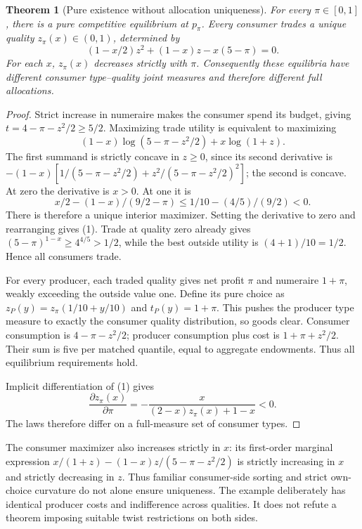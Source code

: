 \documentclass[11pt,a4paper]{article}
\newtheorem{theorem}{Theorem}[section]
\theoremstyle{remark}
\begin{document}
\begin{theorem}[Pure existence without allocation uniqueness]
For every $\pi\in[0,1]$, there is a pure competitive equilibrium at $p_\pi$. Every consumer trades a unique quality $z_\pi(x)\in(0,1)$, determined by
\[
 (1-x/2)z^2+(1-x)z-x(5-\pi)=0. \tag{1}
\]
For each $x$, $z_\pi(x)$ decreases strictly with $\pi$. Consequently these equilibria have different consumer type--quality joint measures and therefore different full allocations.
\end{theorem}
\begin{proof}
Strict increase in numeraire makes the consumer spend its budget, giving $t=4-\pi-z^2/2\ge5/2$. Maximizing trade utility is equivalent to maximizing
\[
 (1-x)\log(5-\pi-z^2/2)+x\log(1+z).
\]
The first summand is strictly concave in $z\ge0$, since its second derivative is $-(1-x)[1/(5-\pi-z^2/2)+z^2/(5-\pi-z^2/2)^2]$; the second is concave. At zero the derivative is $x>0$. At one it is
\[
 x/2-(1-x)/(9/2-\pi)\le1/10-(4/5)/(9/2)<0.
\]
There is therefore a unique interior maximizer. Setting the derivative to zero and rearranging gives (1). Trade at quality zero already gives $(5-\pi)^{1-x}\ge4^{4/5}>1/2$, while the best outside utility is $(4+1)/10=1/2$. Hence all consumers trade.

For every producer, each traded quality gives net profit $\pi$ and numeraire $1+\pi$, weakly exceeding the outside value one. Define its pure choice as $z_P(y)=z_\pi(1/10+y/10)$ and $t_P(y)=1+\pi$. This pushes the producer type measure to exactly the consumer quality distribution, so goods clear. Consumer consumption is $4-\pi-z^2/2$; producer consumption plus cost is $1+\pi+z^2/2$. Their sum is five per matched quantile, equal to aggregate endowments. Thus all equilibrium requirements hold.

Implicit differentiation of (1) gives
\[
 \frac{\partial z_\pi(x)}{\partial\pi}
 =-\frac{x}{(2-x)z_\pi(x)+1-x}<0.
\]
The laws therefore differ on a full-measure set of consumer types.
\end{proof}

The consumer maximizer also increases strictly in $x$: its first-order marginal expression $x/(1+z)-(1-x)z/(5-\pi-z^2/2)$ is strictly increasing in $x$ and strictly decreasing in $z$. Thus familiar consumer-side sorting and strict own-choice curvature do not alone ensure uniqueness. The example deliberately has identical producer costs and indifference across qualities. It does not refute a theorem imposing suitable twist restrictions on both sides.
\end{document}
